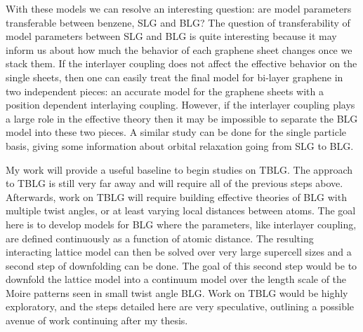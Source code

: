 \documentclass[12pt]{article}
\begin{document}
With these models we can resolve an interesting question: are model parameters transferable between benzene, SLG and BLG?
The question of transferability of model parameters between SLG and BLG is quite interesting because it may inform us about how much the behavior of each graphene sheet changes once we stack them.
If the interlayer coupling does not affect the effective behavior on the single sheets, then one can easily treat the final model for bi-layer graphene in two independent pieces: an accurate model for the graphene sheets with a position dependent interlaying coupling.
However, if the interlayer coupling plays a large role in the effective theory then it may be impossible to separate the BLG model into these two pieces.
A similar study can be done for the single particle basis, giving some information about orbital relaxation going from SLG to BLG.

My work will provide a useful baseline to begin studies on TBLG.
The approach to TBLG is still very far away and will require all of the previous steps above. 
Afterwards, work on TBLG will require building effective theories of BLG with multiple twist angles, or at least varying local distances between atoms.
The goal here is to develop models for BLG where the parameters, like interlayer coupling, are defined continuously as a function of atomic distance.
The resulting interacting lattice model can then be solved over very large supercell sizes and a second step of downfolding can be done.
The goal of this second step would be to downfold the lattice model into a continuum model over the length scale of the Moire patterns seen in small twist angle BLG.
Work on TBLG would be highly exploratory, and the steps detailed here are very speculative, outlining a possible avenue of work continuing after my thesis.
\end{document}
